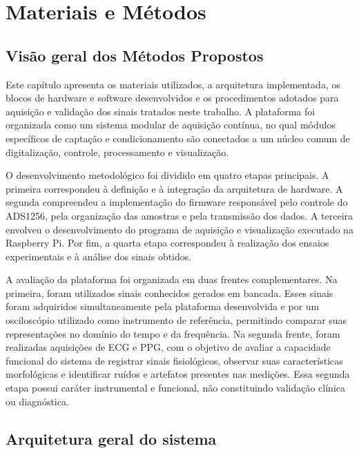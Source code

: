 \documentclass[a4paper,12pt]{fcte}
\begin{document}
\chapter{Materiais e Métodos}
\label{chap:MM}

\section{Visão geral dos Métodos Propostos}
\label{sec:visao_geral_metodologia}

Este capítulo apresenta os materiais utilizados, a arquitetura implementada, os blocos de hardware e software desenvolvidos e os procedimentos adotados para aquisição e validação dos sinais tratados neste trabalho. A plataforma foi organizada como um sistema modular de aquisição contínua, no qual módulos específicos de captação e condicionamento são conectados a um núcleo comum de digitalização, controle, processamento e visualização.

O desenvolvimento metodológico foi dividido em quatro etapas principais. A primeira correspondeu à definição e à integração da arquitetura de hardware. A segunda compreendeu a implementação do firmware responsável pelo controle do ADS1256, pela organização das amostras e pela transmissão dos dados. A terceira envolveu o desenvolvimento do programa de aquisição e visualização executado na Raspberry Pi. Por fim, a quarta etapa correspondeu à realização dos ensaios experimentais e à análise dos sinais obtidos.

A avaliação da plataforma foi organizada em duas frentes complementares. Na primeira, foram utilizados sinais conhecidos gerados em bancada. Esses sinais foram adquiridos simultaneamente pela plataforma desenvolvida e por um osciloscópio utilizado como instrumento de referência, permitindo comparar suas representações no domínio do tempo e da frequência. Na segunda frente, foram realizadas aquisições de ECG e PPG, com o objetivo de avaliar a capacidade funcional do sistema de registrar sinais fisiológicos, observar suas características morfológicas e identificar ruídos e artefatos presentes nas medições. Essa segunda etapa possui caráter instrumental e funcional, não constituindo validação clínica ou diagnóstica.


\section{Arquitetura geral do sistema}
\label{sec:arquitetura_geral}
\end{document}

